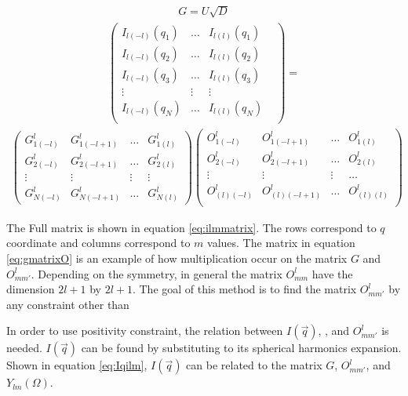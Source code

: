 \begin{eqnarray}
G=U \sqrt{D}
\label{eq:gmatrix}
\end{eqnarray}
\begin{eqnarray*}
  \begin{pmatrix}
    I_{l(-l)}(q_{1})&\dots&I_{l(l)}(q_{1})\\
    I_{l(-l)}(q_{2})&\dots&I_{l(l)}(q_{2})\\
    I_{l(-l)}(q_{3})&\dots&I_{l(l)}(q_{3})\\
    \vdots&\vdots&\vdots& \\
    I_{l(-l)}(q_{N})&\dots&I_{l(l)}(q_{N})\\
  \end{pmatrix}
    =
\label{eq:ilmmatrix}
\end{eqnarray*}
\begin{eqnarray}
  \begin{pmatrix}
    G^{l}_{1(-l)}&G^{l}_{1(-l+1)}&\dots&G^{l}_{1(l)}
\\
    G^{l}_{2(-l)}&G^{l}_{2(-l+1)}&\ldots&G^{l}_{2(l)}
\\
    \vdots&\vdots&\vdots&\vdots \\
    G^{l}_{N(-l)}&G^{l}_{N(-l+1)}&\ldots&G^{l}_{N(l)}
  \end{pmatrix}
  \begin{pmatrix}
    O^{l}_{1(-l)}&O^{l}_{1(-l+1)}&\ldots&O^{l}_{1(l)}\\
    O^{l}_{2(-l)}&O^{l}_{2(-l+1)}&\ldots&O^{l}_{2(l)} \\
    \vdots&\vdots&\vdots&\ldots \\
    O^{l}_{(l)(-l)}&O^{l}_{(l)(-l+1)}&\ldots&O^{l}_{(l)(l)} \\
  \end{pmatrix}
\label{eq:gmatrixO}
\end{eqnarray}

The Full \Ilm matrix is shown in equation \ref{eq:ilmmatrix}. The rows correspond to $q$ coordinate and columns correspond to $m$ values. The matrix in equation \ref{eq:gmatrixO} is an example of how multiplication occur on the matrix $G$ and $O^{l}_{mm'}$. Depending on the symmetry, in general the matrix $O^{l}_{mm}$ have the dimension $2l+1$ by $2l+1$. The goal of this method is to find the matrix $O^{l}_{mm'}$ by any constraint other than \Blq    

In order to use positivity constraint, the relation between $I(\vec{q})$, \Blq, and $O^{l}_{mm'}$ is needed. $I(\vec{q})$ can be found by substituting \Ilm to its spherical harmonics expansion. Shown in equation \ref{eq:Iqilm}, $I(\vec{q})$ can be related to the matrix $G$, $O^{l}_{mm'}$, and $Y_{lm}(\Omega)$. 

